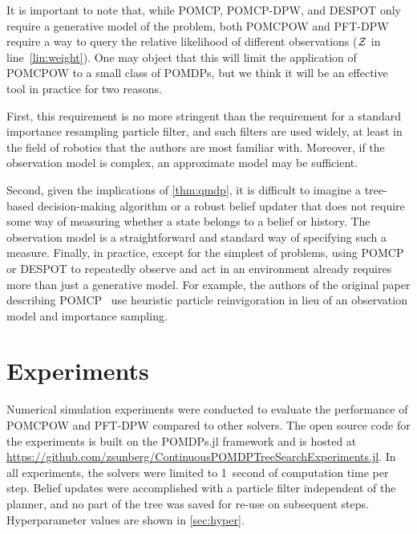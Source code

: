 It is important to note that, while POMCP, POMCP-DPW, and DESPOT only require a generative model of the problem,  both POMCPOW and PFT-DPW require a way to query the relative likelihood of different observations ($\mathcal{Z}$ in line~\ref{lin:weight}).
One may object that this will limit the application of POMCPOW to a small class of POMDPs, but we think it will be an effective tool in practice for two reasons.

First, this requirement is no more stringent than the requirement for a standard importance resampling particle filter, and such filters are used widely, at least in the field of robotics that the authors are most familiar with. 
Moreover, if the observation model is complex, an approximate model may be sufficient.

Second, given the implications of \cref{thm:qmdp}, it is difficult to imagine a tree-based decision-making algorithm or a robust belief updater that does not require some way of measuring whether a state belongs to a belief or history.
The observation model is a straightforward and standard way of specifying such a measure.
Finally, in practice, except for the simplest of problems, using POMCP or DESPOT to repeatedly observe and act in an environment already requires more than just a generative model.
For example, the authors of the original paper describing POMCP~\cite{silver2010pomcp} use heuristic particle reinvigoration in lieu of an observation model and importance sampling.

\section{Experiments} \label{sec:experiments}

Numerical simulation experiments were conducted to evaluate the performance of POMCPOW and PFT-DPW compared to other solvers. The open source code for the experiments is built on the POMDPs.jl framework \cite{egorov2017pomdps} and is hosted at \url{https://github.com/zsunberg/ContinuousPOMDPTreeSearchExperiments.jl}. In all experiments, the solvers were limited to \SI{1}{second} of computation time per step. Belief updates were accomplished with a particle filter independent of the planner, and no part of the tree was saved for re-use on subsequent steps. Hyperparameter values are shown in \cref{sec:hyper}.

